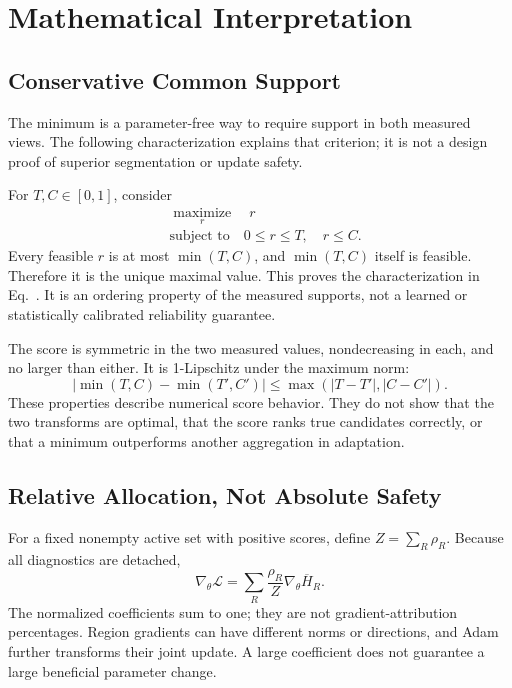 \section{Mathematical Interpretation}
\label{app:theory}
\subsection{Conservative Common Support}
The minimum is a parameter-free way to require support in both measured views. The following characterization explains that criterion; it is not a design proof of superior segmentation or update safety.

For $T,C\in[0,1]$, consider
\begin{equation}
\begin{aligned}
&\underset{r}{\operatorname{maximize}}\quad r\\
&\text{subject to}\quad 0\leq r\leq T,\quad r\leq C.
\end{aligned}
\end{equation}
Every feasible $r$ is at most $\min(T,C)$, and $\min(T,C)$ itself is feasible. Therefore it is the unique maximal value. This proves the characterization in Eq.~. It is an ordering property of the measured supports, not a learned or statistically calibrated reliability guarantee.

The score is symmetric in the two measured values, nondecreasing in each, and no larger than either. It is 1-Lipschitz under the maximum norm:
\begin{equation}
|\min(T,C)-\min(T',C')|
\leq\max(|T-T'|,|C-C'|).
\end{equation}
These properties describe numerical score behavior. They do not show that the two transforms are optimal, that the score ranks true candidates correctly, or that a minimum outperforms another aggregation in adaptation.

\subsection{Relative Allocation, Not Absolute Safety}
For a fixed nonempty active set with positive scores, define $Z=\sum_R\rho_R$. Because all diagnostics are detached,
\begin{equation}
\nabla_\theta\mathcal L
=\sum_R\frac{\rho_R}{Z}\nabla_\theta\overline H_R.
\end{equation}
The normalized coefficients sum to one; they are not gradient-attribution percentages. Region gradients can have different norms or directions, and Adam further transforms their joint update. A large coefficient does not guarantee a large beneficial parameter change.

